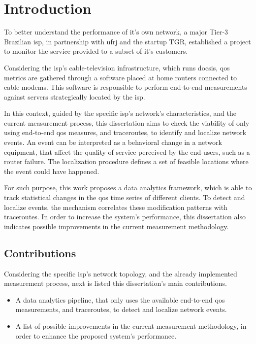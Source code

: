 \chapter{Introduction}

To better understand the performance of it's own network, a major
Tier-3 Brazilian \gls*{isp}, in partnership with \gls*{ufrj} and the startup
TGR,
established a project to monitor the service provided to a subset
of it's customers.

Considering the \gls*{isp}'s cable-television infrastructure,
which runs \gls*{docsis},
\gls*{qos} metrics are gathered through a software placed at home routers
connected to cable modems. This software is responsible to perform end-to-end
measurements against servers strategically located by the \gls*{isp}.

In this context, guided by the specific \gls*{isp}'s network's characteristics,
and the current measurement process,
this dissertation aims to check the viability of
only using end-to-end \gls*{qos} measures, and traceroutes,
to identify and localize network events. An event can be interpreted as a
behavioral change in a network equipment, that affect the quality of service
perceived by the end-users,
such as a router failure. The localization procedure defines a set of
feasible locations where the event could have happened.

For such purpose, this work proposes a data analytics framework, which is able
to track statistical changes in the \gls*{qos} time series of different
clients.
To detect and localize events, the mechanism correlates these modification
patterns with traceroutes.
In order to increase the system's performance,
this dissertation also indicates possible improvements in the current
measurement methodology.

\section{Contributions}

Considering the specific \gls*{isp}'s network topology,
and the already implemented
measurement process, next is listed this dissertation's main contributions.

\begin{itemize}
\item
A data analytics pipeline, that only uses the available end-to-end \gls*{qos}
measurements, and traceroutes, to detect and localize network events.

\item
A list of possible improvements in the current measurement methodology,
in order to enhance the proposed system's performance.

\end{itemize}

